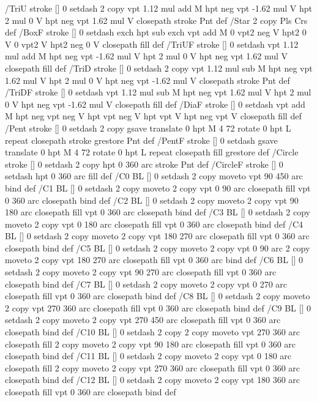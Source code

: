 /TriU {stroke [] 0 setdash 2 copy vpt 1.12 mul add M
  hpt neg vpt -1.62 mul V
  hpt 2 mul 0 V
  hpt neg vpt 1.62 mul V closepath stroke
  Pnt} def
/Star {2 copy Pls Crs} def
/BoxF {stroke [] 0 setdash exch hpt sub exch vpt add M
  0 vpt2 neg V hpt2 0 V 0 vpt2 V
  hpt2 neg 0 V closepath fill} def
/TriUF {stroke [] 0 setdash vpt 1.12 mul add M
  hpt neg vpt -1.62 mul V
  hpt 2 mul 0 V
  hpt neg vpt 1.62 mul V closepath fill} def
/TriD {stroke [] 0 setdash 2 copy vpt 1.12 mul sub M
  hpt neg vpt 1.62 mul V
  hpt 2 mul 0 V
  hpt neg vpt -1.62 mul V closepath stroke
  Pnt} def
/TriDF {stroke [] 0 setdash vpt 1.12 mul sub M
  hpt neg vpt 1.62 mul V
  hpt 2 mul 0 V
  hpt neg vpt -1.62 mul V closepath fill} def
/DiaF {stroke [] 0 setdash vpt add M
  hpt neg vpt neg V hpt vpt neg V
  hpt vpt V hpt neg vpt V closepath fill} def
/Pent {stroke [] 0 setdash 2 copy gsave
  translate 0 hpt M 4 {72 rotate 0 hpt L} repeat
  closepath stroke grestore Pnt} def
/PentF {stroke [] 0 setdash gsave
  translate 0 hpt M 4 {72 rotate 0 hpt L} repeat
  closepath fill grestore} def
/Circle {stroke [] 0 setdash 2 copy
  hpt 0 360 arc stroke Pnt} def
/CircleF {stroke [] 0 setdash hpt 0 360 arc fill} def
/C0 {BL [] 0 setdash 2 copy moveto vpt 90 450 arc} bind def
/C1 {BL [] 0 setdash 2 copy moveto
	2 copy vpt 0 90 arc closepath fill
	vpt 0 360 arc closepath} bind def
/C2 {BL [] 0 setdash 2 copy moveto
	2 copy vpt 90 180 arc closepath fill
	vpt 0 360 arc closepath} bind def
/C3 {BL [] 0 setdash 2 copy moveto
	2 copy vpt 0 180 arc closepath fill
	vpt 0 360 arc closepath} bind def
/C4 {BL [] 0 setdash 2 copy moveto
	2 copy vpt 180 270 arc closepath fill
	vpt 0 360 arc closepath} bind def
/C5 {BL [] 0 setdash 2 copy moveto
	2 copy vpt 0 90 arc
	2 copy moveto
	2 copy vpt 180 270 arc closepath fill
	vpt 0 360 arc} bind def
/C6 {BL [] 0 setdash 2 copy moveto
	2 copy vpt 90 270 arc closepath fill
	vpt 0 360 arc closepath} bind def
/C7 {BL [] 0 setdash 2 copy moveto
	2 copy vpt 0 270 arc closepath fill
	vpt 0 360 arc closepath} bind def
/C8 {BL [] 0 setdash 2 copy moveto
	2 copy vpt 270 360 arc closepath fill
	vpt 0 360 arc closepath} bind def
/C9 {BL [] 0 setdash 2 copy moveto
	2 copy vpt 270 450 arc closepath fill
	vpt 0 360 arc closepath} bind def
/C10 {BL [] 0 setdash 2 copy 2 copy moveto vpt 270 360 arc closepath fill
	2 copy moveto
	2 copy vpt 90 180 arc closepath fill
	vpt 0 360 arc closepath} bind def
/C11 {BL [] 0 setdash 2 copy moveto
	2 copy vpt 0 180 arc closepath fill
	2 copy moveto
	2 copy vpt 270 360 arc closepath fill
	vpt 0 360 arc closepath} bind def
/C12 {BL [] 0 setdash 2 copy moveto
	2 copy vpt 180 360 arc closepath fill
	vpt 0 360 arc closepath} bind def
